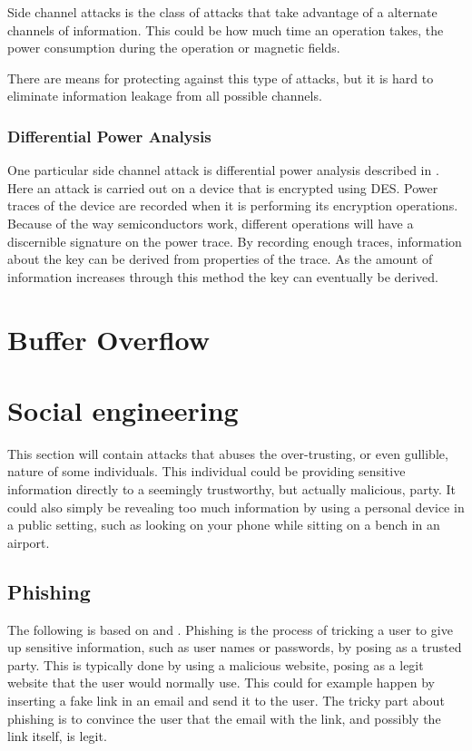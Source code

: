 Side channel attacks is the class of attacks that take advantage of a alternate channels of information.
This could be how much time an operation takes, the power consumption during the operation or magnetic fields.

There are means for protecting against this type of attacks, but it is hard to eliminate information leakage from all possible channels.

\subsubsection{Differential Power Analysis}\label{attack:dpa}
One particular side channel attack is differential power analysis described in \citet{DPA}.
Here an attack is carried out on a device that is encrypted using DES.
Power traces of the device are recorded when it is performing its encryption operations.
Because of the way semiconductors work, different operations will have a discernible signature on the power trace.
By recording enough traces, information about the key can be derived from properties of the trace.
As the amount of information increases through this method the key can eventually be derived.

\section{Buffer Overflow}\label{attack:bufferoverflow}


\section{Social engineering}
This section will contain attacks that abuses the over-trusting, or even gullible, nature of some individuals.
This individual could be providing sensitive information directly to a seemingly trustworthy, but actually malicious, party.
It could also simply be revealing too much information by using a personal device in a public setting, such as looking on your phone while sitting on a bench in an airport.

\subsection{Phishing}\label{attack:phishing}

The following is based on \citet{security_engineering_ross_anderson} and \citet{dhamija2006phishing}.
Phishing is the process of tricking a user to give up sensitive information, such as user names or passwords, by posing as a trusted party.
This is typically done by using a malicious website, posing as a legit website that the user would normally use.
This could for example happen by inserting a fake link in an email and send it to the user.
The tricky part about phishing is to convince the user that the email with the link, and possibly the link itself, is legit.

